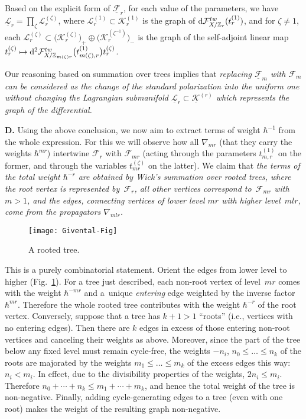 \documentclass[pdftex]{sigma}
\def\F{\mathcal F}
\def\K{\mathcal K}
\def\L{\mathcal L}
\def\ZZ{\mathbb Z}
\def\h{\hbar}
\def\und{\underline}
\begin{document}
Based on the explicit form of $\und{\F}_r$, for each value of the parameters, we have $\und{\L}_r = \prod_{\zeta} \L_r^{(\zeta)}$,
where $\L_r^{(1)}\subset \K_r^{(1)}$ is the graph of ${\rm d}\F_{X/\ZZ_r}^{tw}(t_r^{(1)})$, and for $\zeta\neq 1$, each $\L_r^{(\zeta)} \subset \big(\K_r^{(\zeta)}\big)_{+}\oplus \big(\K_r^{(\zeta^{-1})}\big)_{-}$ is the graph of the self-adjoint linear map
$t_r^{(\zeta)} \mapsto {\rm d}^2 \F^{tw}_{X/\ZZ_{m(\zeta)r}} \big(t_{m(\zeta),r}^{(1)}\big) t_r^{(\zeta)}$.

Our reasoning based on summation over trees implies that {\em replacing $\und{\F}_m$ with $\F_m$ can be considered as the change of the standard polarization into the uniform one without changing the Lagrangian submanifold $\und{\L}_r \subset \und{\K}^{(r)}$ which represents the graph of the differential.}

{\bf D.} Using the above conclusion, we now aim to extract terms of weight $\h^{-1}$ from the whole expression. For this we will observe how all $\nabla_{mr}$ (that they carry the weights $\h^{mr}$) intertwine $\F_r$ with $\F_{mr}$ (acting through the parameters $t_{m,r}^{(1)}$ on the former, and through the variables $t_{mr}^{(\zeta)}$ on the latter). We claim that {\em the terms of the total weight $\h^{-r}$ are obtained by Wick's summation over {\em rooted} trees, where the root vertex is represented by~$\F_r$, all other vertices correspond to~$\F_{mr}$ with $m>1$, and the edges, connecting vertices of lower {\em level} $mr$ with higher level~$mlr$, come from the propagators $\nabla_{mlr}$.}

\begin{figure}[htb]\centering
\texttt{[image: Givental-Fig]}
\caption{A rooted tree.}\label{Fig1}
\end{figure}

This is a purely combinatorial statement. Orient the edges from lower level to higher (Fig.~\ref{Fig1}). For a tree just described, each non-root vertex of level~$mr$ comes with the weight $\h^{-mr}$ and a~unique {\em entering} edge weighted by the inverse factor~$\h^{mr}$. Therefore the whole rooted tree contributes with the weight $\h^{-r}$ of the root vertex. Conversely, suppose that a tree has $k+1>1$ ``roots'' (i.e., vertices with no entering edges). Then there are $k$ edges in excess of those entering non-root vertices and canceling their weights as above. Moreover, since the part of the tree below any fixed level must remain cycle-free, the weights $-n_i$, $n_0\leq \dots \leq n_k$ of the roots are majorated by the weights $m_1\leq \dots \leq m_k$ of the excess edges this way: $n_i<m_i$. In effect, due to the divisibility properties of the weights, $2n_i\leq m_i$. Therefore $n_0+\cdots+n_k \leq m_1+\cdots + m_k$, and hence the total weight of the tree is non-negative. Finally, adding cycle-generating edges to a tree (even with one root) makes the weight of the resulting graph non-negative.
\end{document}
